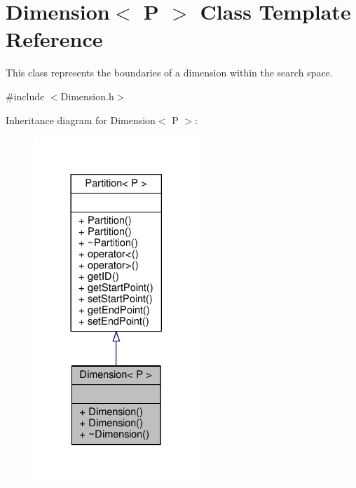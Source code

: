 \hypertarget{classDimension}{}\section{Dimension$<$ P $>$ Class Template Reference}
\label{classDimension}


This class represents the boundaries of a dimension within the search space.  




{\ttfamily \#include $<$Dimension.\+h$>$}



Inheritance diagram for Dimension$<$ P $>$\+:\nopagebreak
\begin{figure}[H]
\begin{center}
\leavevmode
\includegraphics[width=177pt]{classDimension__inherit__graph}
\end{center}
\end{figure}


